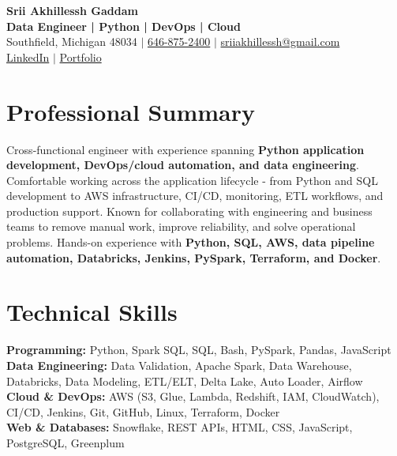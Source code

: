 \documentclass[letterpaper,10pt]{article}
\begin{document}
\fontsize{9.35pt}{10.45pt}\selectfont

\begin{center}
    {\LARGE \textbf{Srii Akhillessh Gaddam}} \\[-1pt]
    \textbf{Data Engineer | Python | DevOps | Cloud} \\[2pt]
    Southfield, Michigan 48034 $|$
    \href{tel:6468752400}{646-875-2400} $|$
    \href{mailto:sriiakhillessh@gmail.com}{sriiakhillessh@gmail.com} \\[1pt]
    \href{https://www.linkedin.com/in/srii-akhiilessh-gaddam-b48668191/}{LinkedIn} $|$
    \href{https://sriiakhillesshg.github.io/portfolio/}{Portfolio}
\end{center}
\vspace{-8pt}

\section{Professional Summary}
\small{Cross-functional engineer with experience spanning \textbf{Python application development, DevOps/cloud automation, and data engineering}. Comfortable working across the application lifecycle - from Python and SQL development to AWS infrastructure, CI/CD, monitoring, ETL workflows, and production support. Known for collaborating with engineering and business teams to remove manual work, improve reliability, and solve operational problems. Hands-on experience with \textbf{Python, SQL, AWS, data pipeline automation, Databricks, Jenkins, PySpark, Terraform, and Docker}.}

\section{Technical Skills}
\small{
\textbf{Programming:} Python, Spark SQL, SQL, Bash, PySpark, Pandas, JavaScript \\
\textbf{Data Engineering:} Data Validation, Apache Spark, Data Warehouse, Databricks, Data Modeling, ETL/ELT, Delta Lake, Auto Loader, Airflow \\
\textbf{Cloud \& DevOps:} AWS (S3, Glue, Lambda, Redshift, IAM, CloudWatch), CI/CD, Jenkins, Git, GitHub, Linux, Terraform, Docker \\
\textbf{Web \& Databases:} Snowflake, REST APIs, HTML, CSS, JavaScript, PostgreSQL, Greenplum
}
\end{document}
